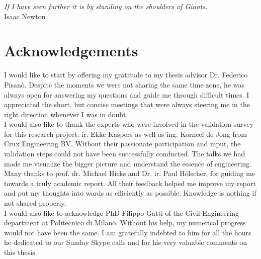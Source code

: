 \documentclass[11pt,a4paper]{report}
\newcommand\blankpage{%
	\null
	\thispagestyle{empty}%
	\addtocounter{page}{-1}%
	\newpage}
\begin{document}
\afterpage{\blankpage}
\newenvironment{dedication}
{\clearpage           %
	\thispagestyle{empty}%
	\vspace*{\stretch{1}}%
	\itshape             %
	\raggedleft          %
}
{\par %
	\vspace{\stretch{3}} %
	\clearpage           %
}
	\begin{dedication}
	\textit{If I have seen further it is by standing on the shoulders of Giants.} \\
	Isaac Newton
	\end{dedication}
\newpage

\afterpage{\blankpage}
\chapter*{Acknowledgements}

\vspace{1cm}
I would like to start by offering my gratitude to my thesis advisor Dr. Federico Pisan\`{o}. Despite the moments we were not sharing the same time zone, he was always open for answering my questions and guide me through difficult times. I appreciated the short, but concise meetings that were always steering me in the right direction whenever I was in doubt.\\


I would also like to thank the experts who were involved in the validation survey for this research project: ir. Ekke Kaspers as well as ing. Korneel de Jong from Crux Engineering BV. Without their passionate participation and input, the validation steps could not have been successfully conducted. The talks we had made me visualize the bigger picture and understand the essence of engineering.\\

Many thanks to prof. dr. Michael Hicks and Dr. ir. Paul H\"{o}lscher, for guiding me towards a truly academic report. All their feedback helped me improve my report and put my thoughts into words as efficiently as possible. Knowledge is nothing if not shared properly.\\

I would also like to acknowledge PhD Filippo Gatti of the Civil Engineering department at Politecnico di Milano. Without his help, my numerical progress would not have been the same. I am gratefully indebted to him for all the hours he dedicated to our Sunday Skype calls and for his very valuable comments on this thesis.\\
\end{document}
